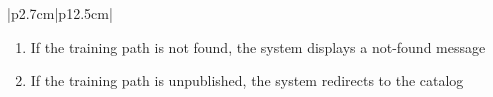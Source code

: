 \begin{table}[H]
\begin{tabular}{|p{2.7cm}|p{12.5cm}|}
\begin{minipage}[t]{\linewidth}
                                      \begin{enumerate}[topsep=0pt,itemsep=1pt,parsep=0pt,partopsep=0pt]
                                          \item If the training path is not found, the system displays a not-found message
                                          \item If the training path is unpublished, the system redirects to the catalog
                                      \end{enumerate}
                                  \end{minipage}                    \\ \hline
    \end{tabular}
    \label{tab:guest-view-details}
\end{table}
